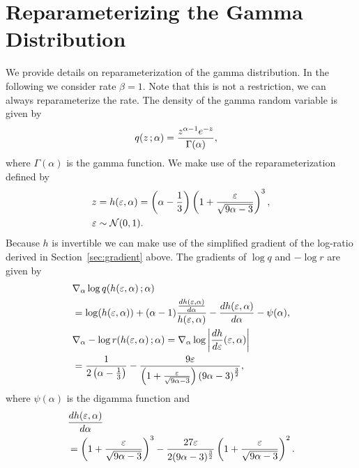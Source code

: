 \section{Reparameterizing the Gamma Distribution}
We provide details on reparameterization of the gamma distribution. In the following we consider rate $\beta=1$. Note that this is not a restriction, we can always reparameterize the rate. The density of the gamma random variable is given by
\begin{align*}
q(z\, ;\alpha) &= \frac{z^{\alpha-1} e^{-z}}{\Gamma(\alpha)},
\end{align*}
where $\Gamma(\alpha)$ is the gamma function. We make use of the reparameterization defined by
\begin{align*}
z &= h(\varepsilon,\alpha) = \left(\alpha-\frac{1}{3}\right)\left(1+\frac{\varepsilon}{\sqrt{9\alpha-3}}\right)^3,\\
\varepsilon &\sim \mathcal{N}(0,1).
\end{align*}
Because $h$ is invertible we can make use of the simplified gradient of the log-ratio derived in Section~\ref{sec:gradient} above. The gradients of $\log q$ and $-\log r$ are given by
\begin{align*}
&\nabla_\alpha  \log q(h(\varepsilon,\alpha)\, ; \alpha) \\
&= \log (h(\varepsilon,\alpha)) + (\alpha-1) \frac{\frac{d h(\varepsilon,\alpha)}{d\alpha}}{h(\varepsilon,\alpha)} -\frac{d h(\varepsilon,\alpha)}{d\alpha} -\psi(\alpha),\\
&\nabla_\alpha - \log r(h(\varepsilon,\alpha)\, ;\alpha) = \nabla_\alpha \log \left| \frac{d h}{d\varepsilon}(\varepsilon,\alpha) \right| \\
&= \frac{1}{2\left(\alpha-\frac{1}{3}\right)} - \frac{9 \varepsilon}{\left(1+\frac{\varepsilon}{\sqrt{9\alpha-3}}\right)\left(9\alpha-3\right)^{\frac{3}{2}}},
\end{align*}
where $\psi(\alpha)$ is the digamma function and
\begin{align*}
&\frac{d h(\varepsilon,\alpha)}{d\alpha} \\
&= \left(1+\frac{\varepsilon}{\sqrt{9\alpha-3}}\right)^3 - \frac{27 \varepsilon}{2(9\alpha-3)^{\frac{3}{2}}}\left(1+\frac{\varepsilon}{\sqrt{9\alpha-3}}\right)^2.
\end{align*}
